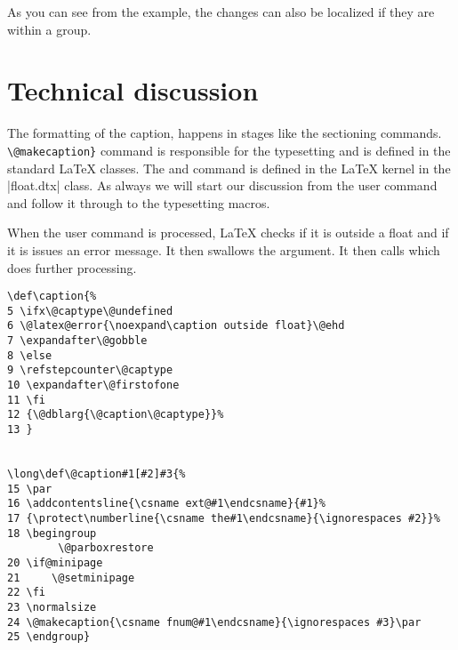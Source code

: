 As you can see from the example, the changes can also be localized if
they are within a group.



\def\captionlabelfont@cx{bf}





\begin{texexample}{}{}
\end{texexample}



\section{Technical discussion}

The formatting of the caption, happens in stages like the sectioning commands.  \lstinline+\@makecaption}+  command is responsible for the typesetting and is defined in the standard LaTeX classes. The  and command is defined in the LaTeX kernel in the 
|float.dtx| class. As always we will start our discussion from the user command and follow it through to the typesetting macros.

When the user command  is processed, LaTeX checks if it is outside a float and if it is issues an error message. It then swallows the argument. It then calls  which does further processing.


\begin{tcolorbox}
\begin{lstlisting}
\def\caption{%
5 \ifx\@captype\@undefined
6 \@latex@error{\noexpand\caption outside float}\@ehd
7 \expandafter\@gobble
8 \else
9 \refstepcounter\@captype
10 \expandafter\@firstofone
11 \fi
12 {\@dblarg{\@caption\@captype}}%
13 }


\long\def\@caption#1[#2]#3{%
15 \par
16 \addcontentsline{\csname ext@#1\endcsname}{#1}%
17 {\protect\numberline{\csname the#1\endcsname}{\ignorespaces #2}}%
18 \begingroup
        \@parboxrestore
20 \if@minipage
21     \@setminipage
22 \fi
23 \normalsize
24 \@makecaption{\csname fnum@#1\endcsname}{\ignorespaces #3}\par
25 \endgroup}
\end{lstlisting}
\end{tcolorbox}

